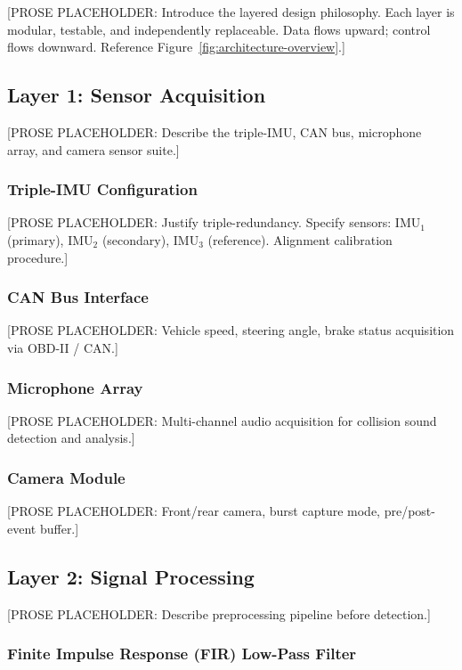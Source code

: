\documentclass[conference,twocolumn]{IEEEtran}
\begin{document}
[PROSE PLACEHOLDER: Introduce the layered design philosophy. Each layer is modular, testable, and independently replaceable. Data flows upward; control flows downward. Reference Figure~\ref{fig:architecture-overview}.]

\subsection{Layer 1: Sensor Acquisition}

[PROSE PLACEHOLDER: Describe the triple-IMU, CAN bus, microphone array, and camera sensor suite.]

\subsubsection{Triple-IMU Configuration}

[PROSE PLACEHOLDER: Justify triple-redundancy. Specify sensors: IMU$_1$ (primary), IMU$_2$ (secondary), IMU$_3$ (reference). Alignment calibration procedure.]

\subsubsection{CAN Bus Interface}

[PROSE PLACEHOLDER: Vehicle speed, steering angle, brake status acquisition via OBD-II / CAN.]

\subsubsection{Microphone Array}

[PROSE PLACEHOLDER: Multi-channel audio acquisition for collision sound detection and analysis.]

\subsubsection{Camera Module}

[PROSE PLACEHOLDER: Front/rear camera, burst capture mode, pre/post-event buffer.]

\subsection{Layer 2: Signal Processing}

[PROSE PLACEHOLDER: Describe preprocessing pipeline before detection.]

\subsubsection{Finite Impulse Response (FIR) Low-Pass Filter}
\end{document}
